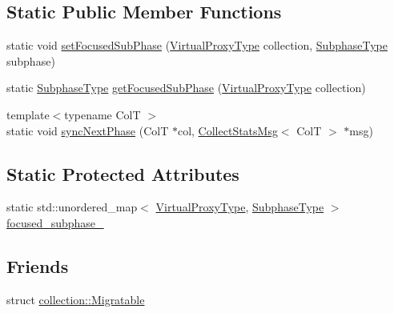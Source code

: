 \subsection*{Static Public Member Functions}
\begin{DoxyCompactItemize}
\item 
static void \hyperlink{structvt_1_1vrt_1_1collection_1_1balance_1_1_collection_l_b_data_aa755c5e50184c714ff8c868df7a8656f}{set\+Focused\+Sub\+Phase} (\hyperlink{namespacevt_a1b417dd5d684f045bb58a0ede70045ac}{Virtual\+Proxy\+Type} collection, \hyperlink{namespacevt_ae78cbfdf1e57470e33eedb074f2beeba}{Subphase\+Type} subphase)
\item 
static \hyperlink{namespacevt_ae78cbfdf1e57470e33eedb074f2beeba}{Subphase\+Type} \hyperlink{structvt_1_1vrt_1_1collection_1_1balance_1_1_collection_l_b_data_a2c2e1fdd16228e1c4513f0b18bfa7bc6}{get\+Focused\+Sub\+Phase} (\hyperlink{namespacevt_a1b417dd5d684f045bb58a0ede70045ac}{Virtual\+Proxy\+Type} collection)
\item 
{\footnotesize template$<$typename ColT $>$ }\\static void \hyperlink{structvt_1_1vrt_1_1collection_1_1balance_1_1_collection_l_b_data_a46f41e14a844c41df0f3854e7455c973}{sync\+Next\+Phase} (ColT $\ast$col, \hyperlink{structvt_1_1vrt_1_1collection_1_1balance_1_1_collect_stats_msg}{Collect\+Stats\+Msg}$<$ ColT $>$ $\ast$msg)
\end{DoxyCompactItemize}
\subsection*{Static Protected Attributes}
\begin{DoxyCompactItemize}
\item 
static std\+::unordered\+\_\+map$<$ \hyperlink{namespacevt_a1b417dd5d684f045bb58a0ede70045ac}{Virtual\+Proxy\+Type}, \hyperlink{namespacevt_ae78cbfdf1e57470e33eedb074f2beeba}{Subphase\+Type} $>$ \hyperlink{structvt_1_1vrt_1_1collection_1_1balance_1_1_collection_l_b_data_a0970caec5bb5092d90d81c95736369b4}{focused\+\_\+subphase\+\_\+}
\end{DoxyCompactItemize}
\subsection*{Friends}
\begin{DoxyCompactItemize}
\item 
struct \hyperlink{structvt_1_1vrt_1_1collection_1_1balance_1_1_collection_l_b_data_ad16bcfc5db0df5769bebcb8888c723d0}{collection\+::\+Migratable}
\end{DoxyCompactItemize}
